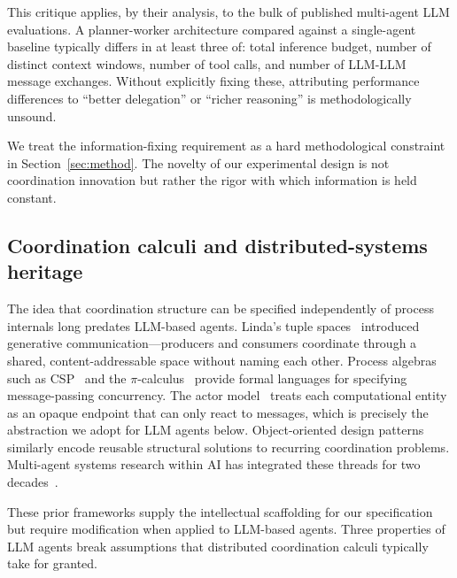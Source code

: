 \documentclass[11pt]{article}
\begin{document}
This critique applies, by their analysis, to the bulk of published multi-agent LLM evaluations. A planner-worker architecture compared against a single-agent baseline typically differs in at least three of: total inference budget, number of distinct context windows, number of tool calls, and number of LLM-LLM message exchanges. Without explicitly fixing these, attributing performance differences to ``better delegation'' or ``richer reasoning'' is methodologically unsound.

We treat the information-fixing requirement as a hard methodological constraint in Section~\ref{sec:method}. The novelty of our experimental design is not coordination innovation but rather the rigor with which information is held constant.

\subsection{Coordination calculi and distributed-systems heritage}
\label{sec:related-calculi}

The idea that coordination structure can be specified independently of process internals long predates LLM-based agents. Linda's tuple spaces~\citep{gelernter1985linda} introduced generative communication---producers and consumers coordinate through a shared, content-addressable space without naming each other. Process algebras such as CSP~\citep{hoare1985csp} and the $\pi$-calculus~\citep{milner1999pi} provide formal languages for specifying message-passing concurrency. The actor model~\citep{hewitt1973universal} treats each computational entity as an opaque endpoint that can only react to messages, which is precisely the abstraction we adopt for LLM agents below. Object-oriented design patterns~\citep{gamma1994design} similarly encode reusable structural solutions to recurring coordination problems. Multi-agent systems research within AI has integrated these threads for two decades~\citep{wooldridge2009introduction,stone2000multiagent}.

These prior frameworks supply the intellectual scaffolding for our specification but require modification when applied to LLM-based agents. Three properties of LLM agents break assumptions that distributed coordination calculi typically take for granted.
\end{document}
